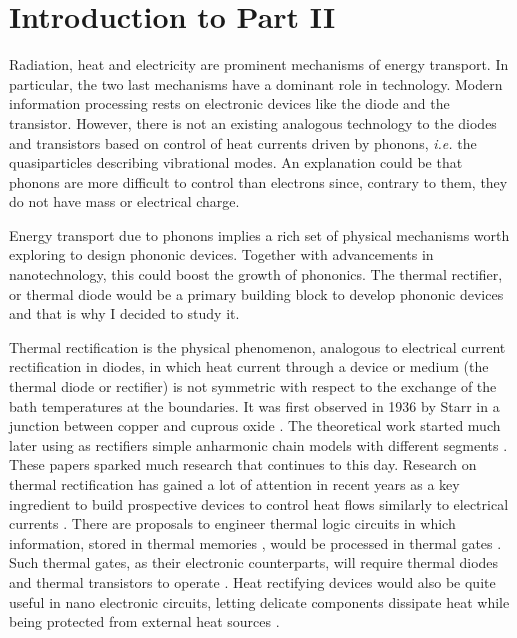 
\chapter*{Introduction to Part II}
\label{IntroductionPartII}

Radiation, heat and electricity are prominent mechanisms of energy transport. In particular, the two last mechanisms have a dominant role in technology. Modern information processing rests on electronic devices like the diode and the transistor. However, there is not an existing analogous technology to the diodes and transistors based on control of heat currents driven by phonons, \textit{i.e.} the quasiparticles describing vibrational modes. An explanation could be that phonons are more difficult to control than electrons since, contrary to them, they do not have mass or electrical charge.

Energy transport due to phonons implies a rich set of physical mechanisms worth exploring to design phononic devices. Together with advancements in nanotechnology, this could boost the growth of phononics. The thermal rectifier, or thermal diode would be a primary building block to develop phononic devices and that is why I decided to study it.

Thermal rectification is the physical phenomenon, analogous to electrical current rectification in diodes, in which heat current through a device or medium (the thermal diode or rectifier) is not symmetric with respect to the exchange of the bath temperatures at the boundaries. It was  first observed in 1936 by Starr in a junction between copper and cuprous oxide \cite{Starr1936}. The theoretical work started much later  using as rectifiers simple anharmonic chain models
with different segments \cite{Terraneo2002,Li2004}. These papers sparked much research that continues to this day. Research on thermal rectification has gained a lot of attention in recent years as a key ingredient to build prospective devices to control heat flows similarly to electrical currents \cite{Roberts2011,Li2012}. There are  proposals to engineer thermal logic circuits \cite{Ye2017} in which information, stored in thermal memories \cite{Wang2008}, would be processed in thermal gates \cite{Wang2007}. Such thermal gates, as their electronic counterparts,  will require thermal diodes and thermal transistors  to operate \cite{Li2006,Joulain2016}.
Heat rectifying devices would also be quite useful in nano electronic circuits, letting delicate components dissipate heat while being protected from external heat sources \cite{Roberts2011}.

